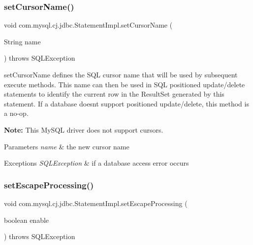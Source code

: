 \subsubsection{\texorpdfstring{set\+Cursor\+Name()}{setCursorName()}}
{\footnotesize\ttfamily void com.\+mysql.\+cj.\+jdbc.\+Statement\+Impl.\+set\+Cursor\+Name (\begin{DoxyParamCaption}\item[{String}]{name }\end{DoxyParamCaption}) throws S\+Q\+L\+Exception}

set\+Cursor\+Name defines the S\+QL cursor name that will be used by subsequent execute methods. This name can then be used in S\+QL positioned update/delete statements to identify the current row in the Result\+Set generated by this statement. If a database doesn\textquotesingle{}t support positioned update/delete, this method is a no-\/op.

{\bfseries Note\+:} This My\+S\+QL driver does not support cursors. 


\begin{DoxyParams}{Parameters}
{\em name} & the new cursor name\\
\hline
\end{DoxyParams}

\begin{DoxyExceptions}{Exceptions}
{\em S\+Q\+L\+Exception} & if a database access error occurs \\
\hline
\end{DoxyExceptions}
\mbox{\label{classcom_1_1mysql_1_1cj_1_1jdbc_1_1_statement_impl_a177506cc06af0885ffceef360e697bb0}} 
\subsubsection{\texorpdfstring{set\+Escape\+Processing()}{setEscapeProcessing()}}
{\footnotesize\ttfamily void com.\+mysql.\+cj.\+jdbc.\+Statement\+Impl.\+set\+Escape\+Processing (\begin{DoxyParamCaption}\item[{boolean}]{enable }\end{DoxyParamCaption}) throws S\+Q\+L\+Exception}

